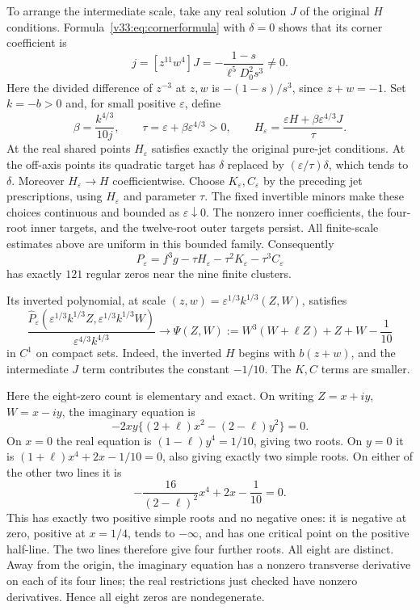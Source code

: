 \documentclass[UTF8,11pt]{ctexart}
\theoremstyle{definition}
\numberwithin{equation}{section}
\begin{document}
To arrange the intermediate scale, take any real solution $J$
of the original $H$ conditions. Formula~\eqref{v33:eq:cornerformula}
with $\delta=0$ shows that its corner coefficient is
\[
 j=[z^{11}w^4]J
   =-\frac{1-s}{\ell^5D_0^2s^3}\ne0.
\]
Here the divided difference of $z^{-3}$ at $z,w$ is
$-(1-s)/s^3$, since $z+w=-1$.
Set $k=-b>0$ and, for small positive $\varepsilon$, define
\begin{equation}\label{v33:eq:intermediate}
 \beta=\frac{k^{4/3}}{10j},\qquad
 \tau=\varepsilon+\beta\varepsilon^{4/3}>0,\qquad
 H_\varepsilon=
 \frac{\varepsilon H+\beta\varepsilon^{4/3}J}{\tau}.
\end{equation}
At the real shared points $H_\varepsilon$ satisfies exactly
the original pure-jet conditions. At the off-axis points its
quadratic target has $\delta$ replaced by
$(\varepsilon/\tau)\delta$, which tends to $\delta$.
Moreover $H_\varepsilon\to H$ coefficientwise. Choose
$K_\varepsilon,C_\varepsilon$ by the preceding jet prescriptions,
using $H_\varepsilon$ and parameter $\tau$. The fixed invertible
minors make these choices continuous and bounded as
$\varepsilon\downarrow0$. The nonzero inner coefficients,
the four-root inner targets, and the twelve-root outer targets
persist. All finite-scale estimates above are uniform in this
bounded family. Consequently
\begin{equation}\label{v33:eq:family}
 P_\varepsilon=f^3g-\tau H_\varepsilon
              -\tau^2K_\varepsilon-\tau^3C_\varepsilon
\end{equation}
has exactly $121$ regular zeros near the nine finite clusters.

Its inverted polynomial, at scale
$(z,w)=\varepsilon^{1/3}k^{1/3}(Z,W)$, satisfies
\begin{equation}\label{v33:eq:infinity}
 \frac{\widehat P_\varepsilon
   (\varepsilon^{1/3}k^{1/3}Z,
    \varepsilon^{1/3}k^{1/3}W)}
      {\varepsilon^{4/3}k^{4/3}}
 \longrightarrow
 \Psi(Z,W):=W^3(W+\ell Z)+Z+W-\frac1{10}
\end{equation}
in $C^1$ on compact sets. Indeed, the inverted $H$ begins
with $b(z+w)$, and the intermediate $J$ term contributes
the constant $-1/10$. The $K,C$ terms are smaller.

Here the eight-zero count is elementary and exact. On writing
$Z=x+iy$, $W=x-iy$, the imaginary equation is
\[
 -2xy\{(2+\ell)x^2-(2-\ell)y^2\}=0.
\]
On $x=0$ the real equation is
$(1-\ell)y^4=1/10$, giving two roots. On $y=0$ it is
$(1+\ell)x^4+2x-1/10=0$, also giving exactly two simple
roots. On either of the other two lines it is
\[
 -\frac{16}{(2-\ell)^2}x^4+2x-\frac1{10}=0.
\]
This has exactly two positive simple roots and no negative
ones: it is negative at zero, positive at $x=1/4$, tends
to $-\infty$, and has one critical point on the positive
half-line. The two lines therefore give four further roots.
All eight are distinct. Away from the origin, the imaginary
equation has a nonzero transverse derivative on each of its
four lines; the real restrictions just checked have nonzero
derivatives. Hence all eight zeros are nondegenerate.
\end{document}
